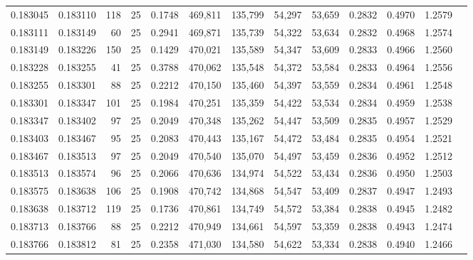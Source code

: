 \begin{tabular}{rrrrrrrrrrrrr}
0.183045 & 0.183110 &   118 &  25 &                                     0.1748 & 469,811 & 135,799 &  54,297 &  53,659 & 0.2832 & 0.4970 & 1.2579 \\
0.183111 & 0.183149 &    60 &  25 &                                     0.2941 & 469,871 & 135,739 &  54,322 &  53,634 & 0.2832 & 0.4968 & 1.2574 \\
0.183149 & 0.183226 &   150 &  25 &                                     0.1429 & 470,021 & 135,589 &  54,347 &  53,609 & 0.2833 & 0.4966 & 1.2560 \\
0.183228 & 0.183255 &    41 &  25 &                                     0.3788 & 470,062 & 135,548 &  54,372 &  53,584 & 0.2833 & 0.4964 & 1.2556 \\
0.183255 & 0.183301 &    88 &  25 &                                     0.2212 & 470,150 & 135,460 &  54,397 &  53,559 & 0.2834 & 0.4961 & 1.2548 \\
0.183301 & 0.183347 &   101 &  25 &                                     0.1984 & 470,251 & 135,359 &  54,422 &  53,534 & 0.2834 & 0.4959 & 1.2538 \\
0.183347 & 0.183402 &    97 &  25 &                                     0.2049 & 470,348 & 135,262 &  54,447 &  53,509 & 0.2835 & 0.4957 & 1.2529 \\
0.183403 & 0.183467 &    95 &  25 &                                     0.2083 & 470,443 & 135,167 &  54,472 &  53,484 & 0.2835 & 0.4954 & 1.2521 \\
0.183467 & 0.183513 &    97 &  25 &                                     0.2049 & 470,540 & 135,070 &  54,497 &  53,459 & 0.2836 & 0.4952 & 1.2512 \\
0.183513 & 0.183574 &    96 &  25 &                                     0.2066 & 470,636 & 134,974 &  54,522 &  53,434 & 0.2836 & 0.4950 & 1.2503 \\
0.183575 & 0.183638 &   106 &  25 &                                     0.1908 & 470,742 & 134,868 &  54,547 &  53,409 & 0.2837 & 0.4947 & 1.2493 \\
0.183638 & 0.183712 &   119 &  25 &                                     0.1736 & 470,861 & 134,749 &  54,572 &  53,384 & 0.2838 & 0.4945 & 1.2482 \\
0.183713 & 0.183766 &    88 &  25 &                                     0.2212 & 470,949 & 134,661 &  54,597 &  53,359 & 0.2838 & 0.4943 & 1.2474 \\
0.183766 & 0.183812 &    81 &  25 &                                     0.2358 & 471,030 & 134,580 &  54,622 &  53,334 & 0.2838 & 0.4940 & 1.2466 \\

\end{tabular}
